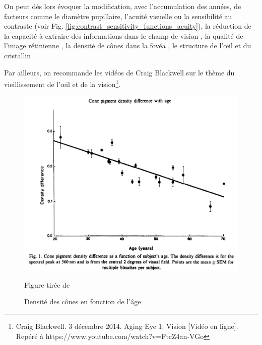 	\par On peut dès lors évoquer la modification, avec l'accumulation des années, de facteurs comme le diamètre pupillaire, l'acuité visuelle ou la sensibilité au contraste \citep{owsley_contrast_1983} (voir Fig. \ref{fig:contrast_sensitivity_functions_acuity}), la réduction de la capacité à extraire des informations dans le champ de vision \citep{sekuler_effects_2000,ball_age_1988,roge_influence_2004, roge_deterioration_2009,gross_human_2008}, la qualité de l'image rétinienne \citep{artal_effects_1993}, la densité de cônes dans la fovéa \citep{kilbride_foveal_1986}, le structure de l'œil et du cristallin \citep{cook_aging_1994}.
	
	\par Par ailleurs, on recommande les vidéos de Craig Blackwell sur le thème du vieillissement de l'œil et de la vision\footnote{Craig Blackwell. 3 décembre 2014. Aging Eye 1: Vision [Vidéo en ligne]. Repéré à https://www.youtube.com/watch?v=FtcZ4an-VGo}.
	
	\begin{figure}
		\centering
		\includegraphics[scale=.5]{Figures/ConeDensityAge}
		\caption{Densité des cônes en fonction de l'âge}{Figure tirée de \citep{kilbride_foveal_1986}}
		\label{fig:densite_cones_age}
	\end{figure}